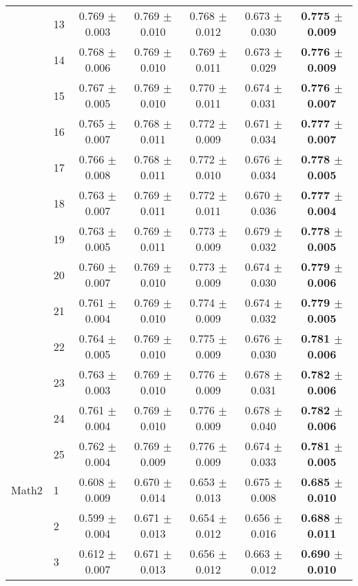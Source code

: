 \begin{table*}[t]
{\begin{tabular}{ll c c c c c}
        & 13 & 0.769 $\pm$ 0.003 & 0.769 $\pm$ 0.010 & 0.768 $\pm$ 0.012 & 0.673 $\pm$ 0.030 & \textbf{0.775 $\pm$ 0.009} \\
        & 14 & 0.768 $\pm$ 0.006 & 0.769 $\pm$ 0.010 & 0.769 $\pm$ 0.011 & 0.673 $\pm$ 0.029 & \textbf{0.776 $\pm$ 0.009} \\
        & 15 & 0.767 $\pm$ 0.005 & 0.769 $\pm$ 0.010 & 0.770 $\pm$ 0.011 & 0.674 $\pm$ 0.031 & \textbf{0.776 $\pm$ 0.007} \\
        & 16 & 0.765 $\pm$ 0.007 & 0.768 $\pm$ 0.011 & 0.772 $\pm$ 0.009 & 0.671 $\pm$ 0.034 & \textbf{0.777 $\pm$ 0.007} \\
        & 17 & 0.766 $\pm$ 0.008 & 0.768 $\pm$ 0.011 & 0.772 $\pm$ 0.010 & 0.676 $\pm$ 0.034 & \textbf{0.778 $\pm$ 0.005} \\
        & 18 & 0.763 $\pm$ 0.007 & 0.769 $\pm$ 0.011 & 0.772 $\pm$ 0.011 & 0.670 $\pm$ 0.036 & \textbf{0.777 $\pm$ 0.004} \\
        & 19 & 0.763 $\pm$ 0.005 & 0.769 $\pm$ 0.011 & 0.773 $\pm$ 0.009 & 0.679 $\pm$ 0.032 & \textbf{0.778 $\pm$ 0.005} \\
        & 20 & 0.760 $\pm$ 0.007 & 0.769 $\pm$ 0.010 & 0.773 $\pm$ 0.009 & 0.674 $\pm$ 0.030 & \textbf{0.779 $\pm$ 0.006} \\
        & 21 & 0.761 $\pm$ 0.004 & 0.769 $\pm$ 0.010 & 0.774 $\pm$ 0.009 & 0.674 $\pm$ 0.032 & \textbf{0.779 $\pm$ 0.005} \\
        & 22 & 0.764 $\pm$ 0.005 & 0.769 $\pm$ 0.010 & 0.775 $\pm$ 0.009 & 0.676 $\pm$ 0.030 & \textbf{0.781 $\pm$ 0.006} \\
        & 23 & 0.763 $\pm$ 0.003 & 0.769 $\pm$ 0.010 & 0.776 $\pm$ 0.009 & 0.678 $\pm$ 0.031 & \textbf{0.782 $\pm$ 0.006} \\
        & 24 & 0.761 $\pm$ 0.004 & 0.769 $\pm$ 0.010 & 0.776 $\pm$ 0.009 & 0.678 $\pm$ 0.040 & \textbf{0.782 $\pm$ 0.006} \\
        & 25 & 0.762 $\pm$ 0.004 & 0.769 $\pm$ 0.009 & 0.776 $\pm$ 0.009 & 0.674 $\pm$ 0.033 & \textbf{0.781 $\pm$ 0.005} \\
\midrule
Math2 & 1 & 0.608 $\pm$ 0.009 & 0.670 $\pm$ 0.014 & 0.653 $\pm$ 0.013 & 0.675 $\pm$ 0.008 & \textbf{0.685 $\pm$ 0.010} \\
        & 2 & 0.599 $\pm$ 0.004 & 0.671 $\pm$ 0.013 & 0.654 $\pm$ 0.012 & 0.656 $\pm$ 0.016 & \textbf{0.688 $\pm$ 0.011} \\
        & 3 & 0.612 $\pm$ 0.007 & 0.671 $\pm$ 0.013 & 0.656 $\pm$ 0.012 & 0.663 $\pm$ 0.012 & \textbf{0.690 $\pm$ 0.010} \\

\end{tabular}}
\end{table*}
